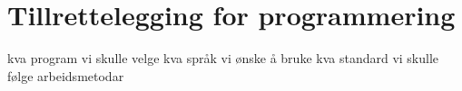 \chapter{Tillrettelegging for programmering}
\thispagestyle{fancy}

kva program vi skulle velge
kva språk vi ønske å bruke
kva standard vi skulle følge
arbeidsmetodar
